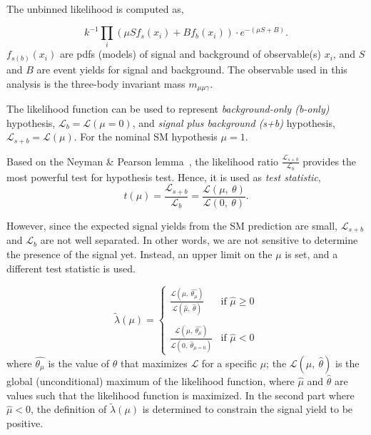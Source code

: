 	The unbinned likelihood is computed as,
	
	 \begin{equation}
	k^{-1}\displaystyle\prod_{i} (\mu S f_{s} (x_{i})+Bf_{b} (x_{i}))\cdot e^{-(\mu S+B)}. 
	\end{equation}
	$f_{s(b)}(x_{i})$ are pdfs (models) of signal and background of observable(s) $x_{i}$, and $S$ and $B$ are event yields for signal and background. The observable used in this analysis is the three-body invariant mass $m_{\mu\mu\gamma}$. 
	
	The likelihood function can be used to represent \emph{background-only (b-only)} hypothesis, $\mathcal{L}_{b}=\mathcal{L}(\mu=0)$, and \emph{signal plus background (s+b)} hypothesis, $\mathcal{L}_{s+b}=\mathcal{L}(\mu)$. For the nominal SM hypothesis $\mu=1$. 
	
	Based on the Neyman \& Pearson lemma~\cite{Neyman1992}, the likelihood ratio $\frac{\mathcal{L}_{s+b}}{\mathcal{L}_{b}}$ provides the most powerful test for hypothesis test. Hence, it is used as \emph{test statistic}, 
	\begin{equation}
	t(\mu)=\frac{\mathcal{L}_{s+b}}{\mathcal{L}_{b}}=\frac{\mathcal{L}(\mu,\ \theta)}{\mathcal{L}(0,\ \theta)}. 
	\end{equation}
	
	However, since the expected signal yields from the SM prediction are small, $\mathcal{L}_{s+b}$ and $\mathcal{L}_{b}$ are not well separated. In other words, we are not sensitive to determine the presence of the signal yet. Instead, an upper limit on the $\mu$ is set, and a different test statistic is used. 

\[ \tilde{\lambda}(\mu) =
  \begin{cases}
  \displaystyle
    \frac{\mathcal{L}(\mu,\ \hat{\theta_{\mu}})}{\mathcal{L}(\hat{\mu},\ \hat{\theta})}        & \text{if } \hat{\mu}\geq0\\
    \\
    \displaystyle
    \frac{\mathcal{L}(\mu,\ \hat{\theta_{\mu}})}{\mathcal{L}(0,\ \hat{\theta}_{\mu=0})}      & \text{if } \hat{\mu}<0
  \end{cases}
\]
where $\hat{\theta_{\mu}}$ is the value of $\theta$ that maximizes $\mathcal{L}$ for a specific $\mu$; the $\mathcal{L}(\hat{\mu},\ \hat{\theta})$ is the global (unconditional) maximum of the likelihood function, where $\hat{\mu}$ and $\hat{\theta}$ are values such that the likelihood function is maximized. 
In the second part where $\hat{\mu}<0$, the definition of $\tilde{\lambda}(\mu)$ is determined to constrain the signal yield to be positive.

